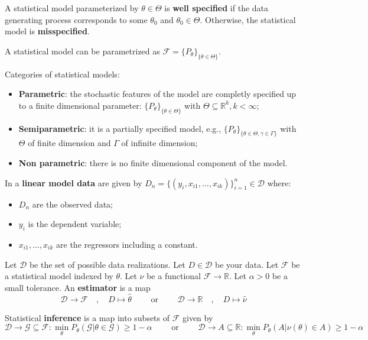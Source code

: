 \documentclass[12pt,]{book}
\providecommand{\tightlist}{%
  \setlength{\itemsep}{0pt}\setlength{\parskip}{0pt}}
\begin{document}
A statistical model parameterized by \(\theta \in \Theta\) is \textbf{well specified} if the data generating process corresponds to some \(\theta_0\) and \(\theta_0 \in \Theta\). Otherwise, the statistical model is \textbf{misspecified}.

A statistical model can be parametrized as \(\mathcal{F} = \{ P_\theta \} _ {\{ \theta \in \Theta \}}\).

Categories of statistical models:

\begin{itemize}
\tightlist
\item
  \textbf{Parametric}: the stochastic features of the model are completly specified up to a finite dimensional parameter: \(\{ P_\theta \} _ { \{ \theta \in \Theta \}}\) with \(\Theta \subseteq \mathbb{R}^k, k<\infty\);
\item
  \textbf{Semiparametric}: it is a partially specified model, e.g., \(\{ P_\theta \} _ { \{ \theta \in \Theta, \gamma \in \Gamma \}}\) with \(\Theta\) of finite dimension and \(\Gamma\) of infinite dimension;
\item
  \textbf{Non parametric}: there is no finite dimensional component of the model.
\end{itemize}

In a \textbf{linear model data} are given by \(D_n = \{ (y_i, x _ {i1}, \dots, x _ {ik}) \} _ {i=1}^n \in \mathcal{D}\) where:

\begin{itemize}
\tightlist
\item
  \(D_n\) are the observed data;
\item
  \(y_i\) is the dependent variable;
\item
  \(x_ {i1}, \dots, x_ {ik}\) are the regressors including a constant.
\end{itemize}

Let \(\mathcal{D}\) be the set of possible data realizations. Let \(D \in \mathcal{D}\) be your data. Let \(\mathcal{F}\) be a statistical model indexed by \(\theta\). Let \(\nu\) be a functional \(\mathcal{F} \to \mathbb{R}\). Let \(\alpha > 0\) be a small tolerance. An \textbf{estimator} is a map
\[
        \mathcal{D} \to \mathcal{F} \quad , \quad  D \mapsto \hat{\theta} \qquad \text{ or } \qquad \mathcal{D} \to \mathbb{R} \quad , \quad D \mapsto \hat{\nu}
\]

Statistical \textbf{inference} is a map into subsets of \(\mathcal{F}\) given by
\[
  \mathcal{D} \to \mathcal{G} \subseteq \mathcal{F}: \min _ \theta P_\theta (\mathcal{G} | \theta \in \mathcal{G}) \geq 1-\alpha  \qquad \text{ or } \qquad \mathcal{D} \to A \subseteq \mathbb{R}: \min _ \theta P_\theta (A | \nu(\theta) \in A) \geq 1-\alpha
\]
\end{document}
